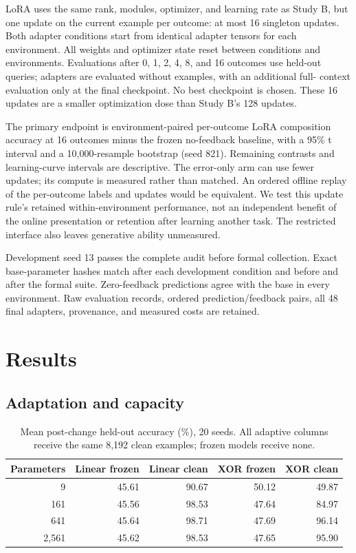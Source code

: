 \documentclass[11pt]{article}
\begin{document}
LoRA uses the same rank, modules, optimizer, and learning rate as Study B,
but one update on the current example per outcome: at most 16 singleton
updates. Both adapter conditions start from identical adapter tensors for each
environment. All weights and optimizer state reset between conditions and
environments. Evaluations after 0, 1, 2, 4, 8, and 16 outcomes use held-out
queries; adapters are evaluated without examples, with an additional full-
context evaluation only at the final checkpoint. No best checkpoint is chosen.
These 16 updates are a smaller optimization dose than Study B's 128 updates.

The primary endpoint is environment-paired per-outcome LoRA composition
accuracy at 16 outcomes minus the frozen no-feedback baseline, with a 95\% t
interval and a 10,000-resample bootstrap (seed 821). Remaining contrasts and
learning-curve intervals are descriptive. The error-only arm can use fewer
updates; its compute is measured rather than matched. An ordered offline
replay of the per-outcome labels and updates would be equivalent. We test this
update rule's retained within-environment performance, not an independent
benefit of the online presentation or retention after learning another task.
The restricted interface also leaves generative ability unmeasured.

Development seed 13 passes the complete audit before formal collection.
Exact base-parameter hashes match after each development condition and before
and after the formal suite. Zero-feedback predictions agree with the base
in every environment. Raw evaluation records, ordered prediction/feedback
pairs, all 48 final adapters, provenance, and measured costs are retained.

\section{Results}
\subsection{Adaptation and capacity}
\begin{table}[ht]
\centering
\caption{Mean post-change held-out accuracy (\%), 20 seeds. All adaptive
columns receive the same 8,192 clean examples; frozen models receive none.}
\begin{tabular}{r r r r r}
\toprule
Parameters & Linear frozen & Linear clean & XOR frozen & XOR clean\\
\midrule
9 & 45.61 & 90.67 & 50.12 & 49.87\\
161 & 45.56 & 98.53 & 47.64 & 84.97\\
641 & 45.64 & 98.71 & 47.69 & 96.14\\
2,561 & 45.62 & 98.53 & 47.65 & 95.90\\
\bottomrule
\end{tabular}
\end{table}
\end{document}
